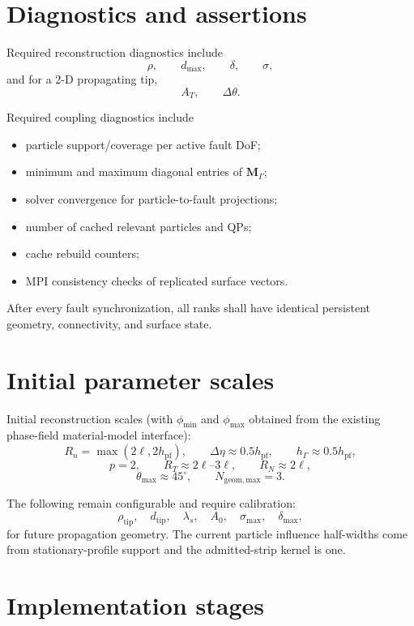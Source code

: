 \documentclass[11pt]{article}
\begin{document}
\section{Diagnostics and assertions}

Required reconstruction diagnostics include
\[
\rho,\qquad d_{\max},\qquad\delta,\qquad\sigma,
\]
and for a 2-D propagating tip,
\[
A_T,\qquad\Delta\theta.
\]

Required coupling diagnostics include
\begin{itemize}
  \item particle support/coverage per active fault DoF;
  \item minimum and maximum diagonal entries of $\mathbf{M}_\Gamma$;
  \item solver convergence for particle-to-fault projections;
  \item number of cached relevant particles and QPs;
  \item cache rebuild counters;
  \item MPI consistency checks of replicated surface vectors.
\end{itemize}

After every fault synchronization, all ranks shall have identical persistent geometry, connectivity, and surface state.

\section{Initial parameter scales}

Initial reconstruction scales (with $\phi_{\min}$ and $\phi_{\max}$ obtained from the existing phase-field material-model interface):
\[
R_n=\max(2\ell,2h_{\mathrm{pf}}),
\qquad
\Delta\eta\approx0.5h_{\mathrm{pf}},
\qquad
h_\Gamma\approx0.5h_{\mathrm{pf}},
\]
\[
p=2,
\qquad
R_T\approx2\ell\text{--}3\ell,
\qquad
R_N\approx2\ell,
\]
\[
\theta_{\max}\approx45^\circ,
\qquad
N_{\mathrm{geom,max}}=3.
\]

The following remain configurable and require calibration:
\[
\rho_{\mathrm{tip}},\quad
d_{\mathrm{tip}},\quad
\lambda_s,\quad
A_0,\quad
\sigma_{\max},\quad
\delta_{\max},
\]
for future propagation geometry. The current particle influence half-widths
come from stationary-profile support and the admitted-strip kernel is one.

\section{Implementation stages}
\end{document}
